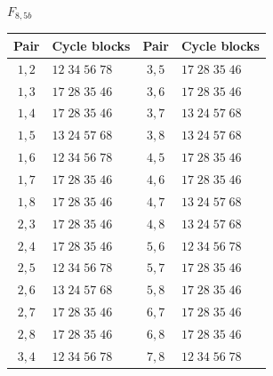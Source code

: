 \documentclass[11pt,a4paper]{article}
\theoremstyle{plain}
\theoremstyle{definition}
\numberwithin{equation}{section}
\begin{document}
\begin{center}\small
$F_{8,5b}$\par\nopagebreak[4]\smallskip\nopagebreak[4]
\begin{tabular}{cl@{\qquad}cl}\toprule Pair&Cycle blocks&Pair&Cycle blocks\\\midrule
$1,2$ & $12\;34\;56\;78$ & $3,5$ & $17\;28\;35\;46$ \\
$1,3$ & $17\;28\;35\;46$ & $3,6$ & $17\;28\;35\;46$ \\
$1,4$ & $17\;28\;35\;46$ & $3,7$ & $13\;24\;57\;68$ \\
$1,5$ & $13\;24\;57\;68$ & $3,8$ & $13\;24\;57\;68$ \\
$1,6$ & $12\;34\;56\;78$ & $4,5$ & $17\;28\;35\;46$ \\
$1,7$ & $17\;28\;35\;46$ & $4,6$ & $17\;28\;35\;46$ \\
$1,8$ & $17\;28\;35\;46$ & $4,7$ & $13\;24\;57\;68$ \\
$2,3$ & $17\;28\;35\;46$ & $4,8$ & $13\;24\;57\;68$ \\
$2,4$ & $17\;28\;35\;46$ & $5,6$ & $12\;34\;56\;78$ \\
$2,5$ & $12\;34\;56\;78$ & $5,7$ & $17\;28\;35\;46$ \\
$2,6$ & $13\;24\;57\;68$ & $5,8$ & $17\;28\;35\;46$ \\
$2,7$ & $17\;28\;35\;46$ & $6,7$ & $17\;28\;35\;46$ \\
$2,8$ & $17\;28\;35\;46$ & $6,8$ & $17\;28\;35\;46$ \\
$3,4$ & $12\;34\;56\;78$ & $7,8$ & $12\;34\;56\;78$ \\
\bottomrule\end{tabular}
\end{center}
\end{document}
